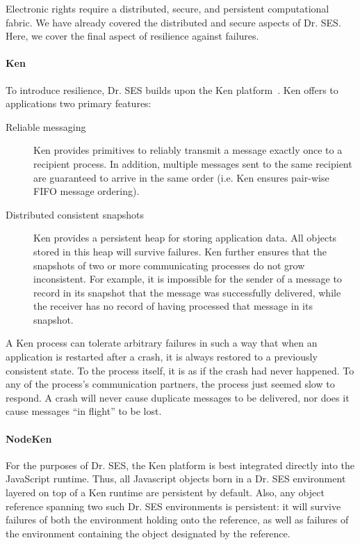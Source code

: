 \documentclass{llncs}
\begin{document}
Electronic rights require a distributed, secure, and persistent computational fabric.
We have already covered the distributed and secure aspects of Dr. SES. Here, we cover the final aspect of resilience against failures.

\paragraph{Ken}

To introduce resilience, Dr. SES builds upon the Ken platform~\cite{Yoo:CKen}. Ken offers to applications two primary features:

\begin{description}
  \item[Reliable messaging] Ken provides primitives to reliably transmit a message exactly once to a recipient process. In addition, multiple messages sent to the same recipient are guaranteed to arrive in the same order (i.e. Ken ensures pair-wise FIFO message ordering).
  \item[Distributed consistent snapshots] Ken provides a persistent heap for storing application data. All objects stored in this heap will survive failures. Ken further ensures that the snapshots of two or more communicating processes do not grow inconsistent. For example, it is impossible for the sender of a message to record in its snapshot that the message was successfully delivered, while the receiver has no record of having processed that message in its snapshot.
\end{description}

A Ken process can tolerate arbitrary failures in such a way that when an application is restarted after a crash, it is always restored to a previously consistent state. To the process itself, it is as if the crash had never happened. To any of the process's communication partners, the process just seemed slow to respond. A crash will never cause duplicate messages to be delivered, nor does it cause messages ``in flight'' to be lost.

\paragraph{NodeKen}

For the purposes of Dr. SES, the Ken platform is best integrated directly into the JavaScript runtime. Thus, all Javascript objects born in a Dr. SES environment layered on top of a Ken runtime are persistent by default. Also, any object reference spanning two such Dr. SES environments is persistent: it will survive failures of both the environment holding onto the reference, as well as failures of the environment containing the object designated by the reference.
\end{document}
